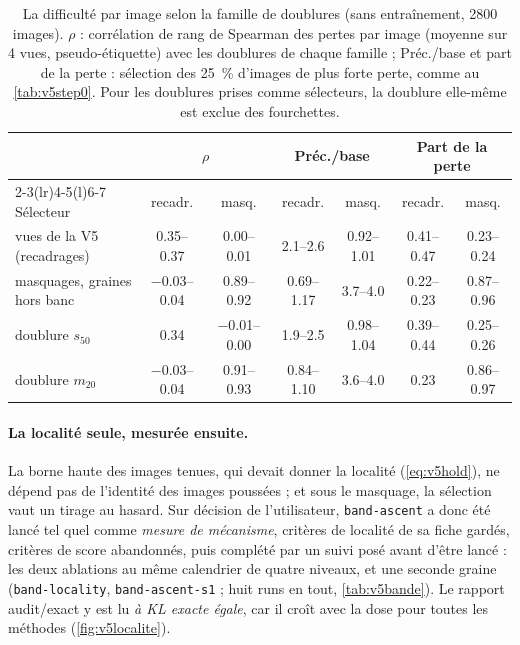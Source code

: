 \documentclass[11pt,a4paper]{article}
\newcommand{\code}[1]{\texttt{#1}}
\begin{document}
\begin{table}[ht]
  \centering\small
  \caption{La difficulté par image selon la famille de doublures (sans entraînement, 2800 images).
  $\rho$ : corrélation de rang de Spearman des pertes par image (moyenne sur 4 vues, pseudo-étiquette)
  avec les doublures de chaque famille ; Préc./base et part de la perte : sélection des
  \SI{25}{\percent} d'images de plus forte perte, comme au \cref{tab:v5step0}. Pour les doublures
  prises comme sélecteurs, la doublure elle-même est exclue des fourchettes.}\label{tab:v5familles}
  \setlength{\tabcolsep}{3.4pt}
  \begin{tabular}{@{}l cc cc cc@{}}
    \toprule
    & \multicolumn{2}{c}{$\rho$} & \multicolumn{2}{c}{Préc./base} & \multicolumn{2}{c}{Part de la perte}\\
    \cmidrule(lr){2-3}\cmidrule(lr){4-5}\cmidrule(l){6-7}
    Sélecteur & recadr. & masq. & recadr. & masq. & recadr. & masq.\\
    \midrule
    vues de la V5 (recadrages) & \numrange{0.35}{0.37} & \numrange{0.00}{0.01} & \numrange{2.1}{2.6}
      & \numrange{0.92}{1.01} & \numrange{0.41}{0.47} & \numrange{0.23}{0.24}\\
    masquages, graines hors banc & \numrange{-0.03}{0.04} & \numrange{0.89}{0.92} & \numrange{0.69}{1.17}
      & \numrange{3.7}{4.0} & \numrange{0.22}{0.23} & \numrange{0.87}{0.96}\\
    doublure $s_{50}$ & \num{0.34} & \numrange{-0.01}{0.00} & \numrange{1.9}{2.5} & \numrange{0.98}{1.04}
      & \numrange{0.39}{0.44} & \numrange{0.25}{0.26}\\
    doublure $m_{20}$ & \numrange{-0.03}{0.04} & \numrange{0.91}{0.93} & \numrange{0.84}{1.10}
      & \numrange{3.6}{4.0} & \num{0.23} & \numrange{0.86}{0.97}\\
    \bottomrule
  \end{tabular}
\end{table}

\paragraph{La localité seule, mesurée ensuite.} La borne haute des images tenues, qui devait donner
la localité (\cref{eq:v5hold}), ne dépend pas de l'identité des images poussées ; et sous le masquage, la
sélection vaut un tirage au hasard. Sur décision de l'utilisateur, \code{band-ascent} a donc été lancé
tel quel comme \emph{mesure de mécanisme}, critères de localité de sa fiche gardés, critères de score
abandonnés, puis complété par un suivi posé avant d'être lancé : les deux ablations au même calendrier de
quatre niveaux, et une seconde graine (\code{band-locality}, \code{band-ascent-s1} ; huit runs en tout,
\cref{tab:v5bande}). Le rapport audit/exact y est lu \emph{à KL exacte égale}, car il croît avec la dose
pour toutes les méthodes (\cref{fig:v5localite}).
\end{document}
